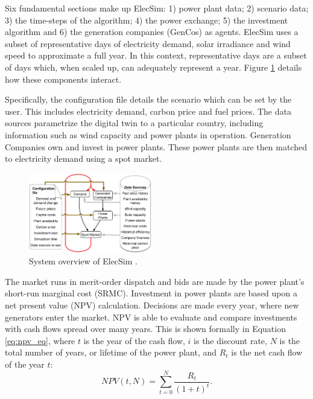 Six fundamental sections make up ElecSim: 1) power plant data; 2) scenario data; 3) the time-steps of the algorithm; 4) the power exchange; 5) the investment algorithm and 6) the generation companies (GenCos) as agents. ElecSim uses a subset of representative days of electricity demand, solar irradiance and wind speed to approximate a full year. In this context, representative days are a subset of days which, when scaled up, can adequately represent a year. Figure \ref{fig:model_details} details how these components interact. 

Specifically, the configuration file details the scenario which can be set by the user. This includes electricity demand, carbon price and fuel prices. The data sources parametrize the digital twin to a particular country, including information such as wind capacity and power plants in operation. Generation Companies own and invest in power plants. These power plants are then matched to electricity demand using a spot market.

\begin{figure}
	\centering
	\includegraphics[width=0.48\textwidth]{Chapter6/figures/setup/System_overview_large.png}
	\caption{System overview of ElecSim \cite{Kell}.}
	\label{fig:model_details}
\end{figure}

The market runs in merit-order dispatch and bids are made by the power plant's short-run marginal cost (SRMC). Investment in power plants are based upon a net present value (NPV) calculation. Decisions are made every year, where new generators enter the market. NPV is able to evaluate and compare investments with cash flows spread over many years. This is shown formally in Equation \ref{eq:npv_eq}, where $t$ is the year of the cash flow, $i$ is the discount rate, $N$ is the total number of years, or lifetime of the power plant, and $R_t$ is the net cash flow of the year $t$:
\begin{equation} \label{eq:npv_eq}
NPV(t, N) = \sum_{t=0}^{N}\frac{R_t}{(1+t)^t}.
\end{equation}

